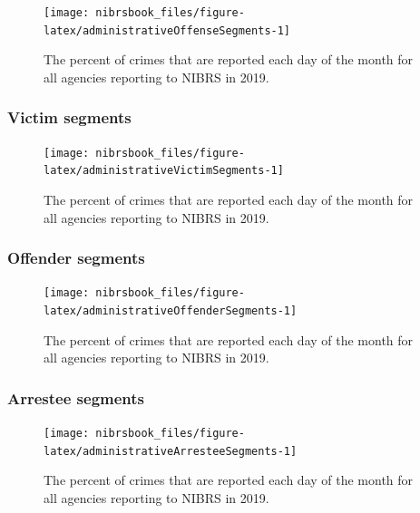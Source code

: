 \documentclass[
  12pt,
  openany]{book}
\begin{document}
\begin{figure}

{\centering \texttt{[image: nibrsbook\_files/figure-latex/administrativeOffenseSegments-1]} 

}

\caption{The percent of crimes that are reported each day of the month for all agencies reporting to NIBRS in 2019.}\label{fig:administrativeOffenseSegments}
\end{figure}

\hypertarget{victim-segments}{%
\subsubsection{Victim segments}\label{victim-segments}}

\begin{figure}

{\centering \texttt{[image: nibrsbook\_files/figure-latex/administrativeVictimSegments-1]} 

}

\caption{The percent of crimes that are reported each day of the month for all agencies reporting to NIBRS in 2019.}\label{fig:administrativeVictimSegments}
\end{figure}

\hypertarget{offender-segments}{%
\subsubsection{Offender segments}\label{offender-segments}}

\begin{figure}

{\centering \texttt{[image: nibrsbook\_files/figure-latex/administrativeOffenderSegments-1]} 

}

\caption{The percent of crimes that are reported each day of the month for all agencies reporting to NIBRS in 2019.}\label{fig:administrativeOffenderSegments}
\end{figure}

\hypertarget{arrestee-segments}{%
\subsubsection{Arrestee segments}\label{arrestee-segments}}

\begin{figure}

{\centering \texttt{[image: nibrsbook\_files/figure-latex/administrativeArresteeSegments-1]} 

}

\caption{The percent of crimes that are reported each day of the month for all agencies reporting to NIBRS in 2019.}\label{fig:administrativeArresteeSegments}
\end{figure}
\end{document}
